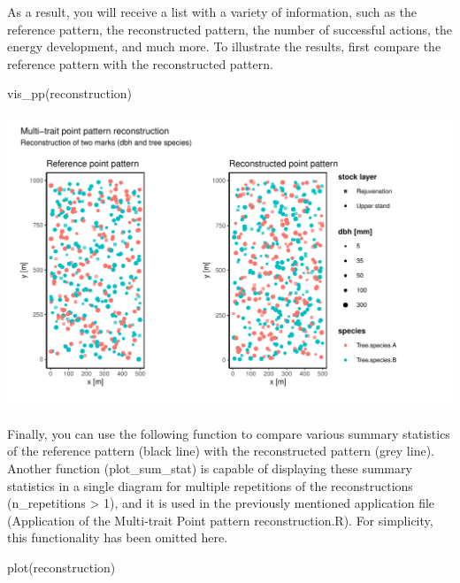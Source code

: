 \documentclass[
  letterpaper,
  DIV=11,
  numbers=noendperiod]{scrreprt}
\newenvironment{Shaded}{\begin{snugshade}}{\end{snugshade}}
\newcommand{\FunctionTok}[1]{\textcolor[rgb]{0.28,0.35,0.67}{#1}}
\newcommand{\NormalTok}[1]{\textcolor[rgb]{0.00,0.23,0.31}{#1}}
\begin{document}
As a result, you will receive a list with a variety of information, such
as the reference pattern, the reconstructed pattern, the number of
successful actions, the energy development, and much more. To illustrate
the results, first compare the reference pattern with the reconstructed
pattern.

\begin{Shaded}
\begin{Highlighting}[]
\FunctionTok{vis\_pp}\NormalTok{(reconstruction) }
\end{Highlighting}
\end{Shaded}

\includegraphics{further_application_examples_files/figure-pdf/unnamed-chunk-4-1.pdf}

Finally, you can use the following function to compare various summary
statistics of the reference pattern (black line) with the reconstructed
pattern (grey line). Another function (plot\_sum\_stat) is capable of
displaying these summary statistics in a single diagram for multiple
repetitions of the reconstructions (n\_repetitions \textgreater{} 1),
and it is used in the previously mentioned application file (Application
of the Multi-trait Point pattern reconstruction.R). For simplicity, this
functionality has been omitted here.

\begin{Shaded}
\begin{Highlighting}[]
\FunctionTok{plot}\NormalTok{(reconstruction)}
\end{Highlighting}
\end{Shaded}
\end{document}
